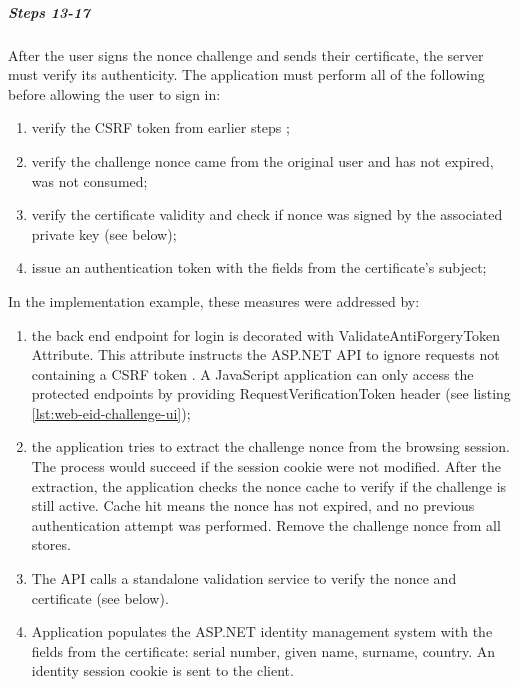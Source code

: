 \subparagraph{Steps 13-17}

After the user signs the nonce challenge and sends their certificate, the server must verify its authenticity. The application must perform all of the following before allowing the user to sign in:

\begin{enumerate}
  \item verify the CSRF token from earlier steps \cite{ria-webeid-source-web-eid-authtoken-validation-java-readme};
  \item verify the challenge nonce came from the original user and has not expired, was not consumed;
  \item verify the certificate validity and check if nonce was signed by the associated private key (see below);
  \item issue an authentication token with the fields from the certificate's subject;
\end{enumerate}

In the implementation example, these measures were addressed by:
\begin{enumerate}
  \item the back end endpoint for login is decorated with ValidateAntiForgeryToken Attribute. This attribute instructs the ASP.NET API to ignore requests not containing a CSRF token \cite{msdocs-anti-request-forgery}. A JavaScript application can only access the protected endpoints by providing RequestVerificationToken header (see listing \ref{lst:web-eid-challenge-ui});
  \item the application tries to extract the challenge nonce from the browsing session. The process would succeed if the session cookie were not modified. After the extraction, the application checks the nonce cache to verify if the challenge is still active. Cache hit means the nonce has not expired, and no previous authentication attempt was performed. Remove the challenge nonce from all stores.
  \item The API calls a standalone validation service to verify the nonce and certificate (see below).
  \item Application populates the ASP.NET identity management system with the fields from the certificate: serial number, given name, surname, country. An identity session cookie is sent to the client.
\end{enumerate}

